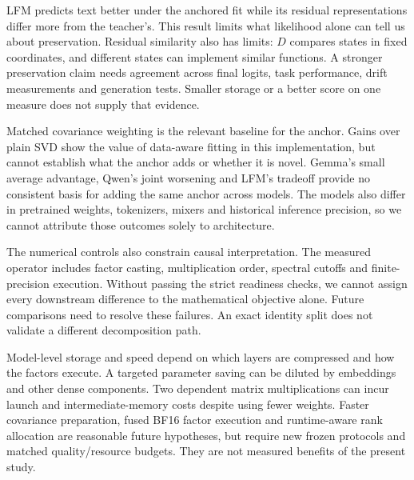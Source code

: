 \documentclass[10pt,a4paper,twocolumn]{article}
\makeatletter
\renewcommand\section{\@startsection{section}{1}{0pt}{2.2ex plus 1ex minus .2ex}{1.1ex plus .2ex}{\normalfont\normalsize\bfseries\centering}}
\makeatother
\begin{document}
\section{Discussion}
LFM predicts text better under the anchored fit while its residual representations differ more from the teacher's. This result limits what likelihood alone can tell us about preservation. Residual similarity also has limits: $D$ compares states in fixed coordinates, and different states can implement similar functions. A stronger preservation claim needs agreement across final logits, task performance, drift measurements and generation tests. Smaller storage or a better score on one measure does not supply that evidence.\par\smallskip
Matched covariance weighting is the relevant baseline for the anchor. Gains over plain SVD show the value of data-aware fitting in this implementation, but cannot establish what the anchor adds or whether it is novel. Gemma's small average advantage, Qwen's joint worsening and LFM's tradeoff provide no consistent basis for adding the same anchor across models. The models also differ in pretrained weights, tokenizers, mixers and historical inference precision, so we cannot attribute those outcomes solely to architecture.\par\smallskip
The numerical controls also constrain causal interpretation. The measured operator includes factor casting, multiplication order, spectral cutoffs and finite-precision execution. Without passing the strict readiness checks, we cannot assign every downstream difference to the mathematical objective alone. Future comparisons need to resolve these failures. An exact identity split does not validate a different decomposition path.\par\smallskip
Model-level storage and speed depend on which layers are compressed and how the factors execute. A targeted parameter saving can be diluted by embeddings and other dense components. Two dependent matrix multiplications can incur launch and intermediate-memory costs despite using fewer weights. Faster covariance preparation, fused BF16 factor execution and runtime-aware rank allocation are reasonable future hypotheses, but require new frozen protocols and matched quality/resource budgets. They are not measured benefits of the present study.\par\smallskip
\end{document}
